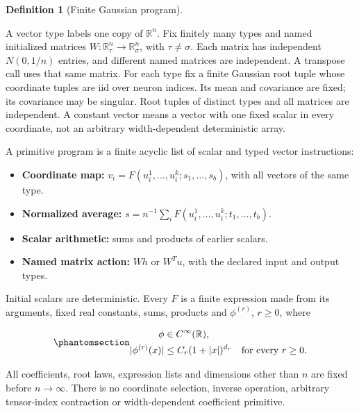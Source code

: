 \documentclass[
  11pt,
]{article}
\providecommand{\tightlist}{%
  \setlength{\itemsep}{0pt}\setlength{\parskip}{0pt}}
\theoremstyle{definition}
\newtheorem{definition}{Definition}[section]
\theoremstyle{plain}
\theoremstyle{plain}
\theoremstyle{plain}
\theoremstyle{remark}
\begin{document}
\begin{definition}[Finite Gaussian
program]\protect\hypertarget{def-mfp-primitive-program}{}\label{def-mfp-primitive-program}

A vector type labels one copy of \(\mathbb R^n\). Fix finitely many
types and named initialized matrices
\(W:\mathbb R^n_\tau\to\mathbb R^n_\sigma\), with \(\tau\ne\sigma\).
Each matrix has independent \(N(0,1/n)\) entries, and different named
matrices are independent. A transpose call uses that same matrix. For
each type fix a finite Gaussian root tuple whose coordinate tuples are
iid over neuron indices. Its mean and covariance are fixed; its
covariance may be singular. Root tuples of distinct types and all
matrices are independent. A constant vector means a vector with one
fixed scalar in every coordinate, not an arbitrary width-dependent
deterministic array.

A primitive program is a finite acyclic list of scalar and typed vector
instructions:

\begin{itemize}
\tightlist
\item
  \textbf{Coordinate map:} \(v_i=F(u_i^1,\ldots,u_i^k;s_1,\ldots,s_b)\),
  with all vectors of the same type.
\item
  \textbf{Normalized average:}
  \(s=n^{-1}\sum_i F(u_i^1,\ldots,u_i^k;t_1,\ldots,t_b)\).
\item
  \textbf{Scalar arithmetic:} sums and products of earlier scalars.
\item
  \textbf{Named matrix action:} \(Wh\) or \(W^Tu\), with the declared
  input and output types.
\end{itemize}

Initial scalars are deterministic. Every \(F\) is a finite expression
made from its arguments, fixed real constants, sums, products and
\(\phi^{(r)}\), \(r\ge0\), where

\begin{equation}\protect\phantomsection\label{eq-mfp-activation-growth}{
\begin{aligned}
\phi&\in C^\infty(\mathbb R),\\
|\phi^{(r)}(x)|&\le C_r(1+|x|)^{d_r}
\quad\text{for every }r\ge0.
\end{aligned}
}\end{equation}

All coefficients, root laws, expression lists and dimensions other than
\(n\) are fixed before \(n\to\infty\). There is no coordinate selection,
inverse operation, arbitrary tensor-index contraction or width-dependent
coefficient primitive.

\end{definition}
\end{document}

